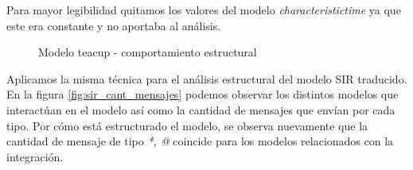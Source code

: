 Para mayor legibilidad quitamos los valores del modelo \textit{characteristictime} 
ya que este era constante y no aportaba al análisis.

\begin{figure}[H]
    \centering     %
        \caption{Modelo teacup - comportamiento estructural}
\end{figure}


Aplicamos la misma técnica para el análisis estructural del modelo SIR traducido.
En la figura \ref{fig:sir_cant_mensajes} podemos observar los distintos modelos
que interactúan en el modelo así como la cantidad de mensajes que envían por
cada tipo.
Por cómo está estructurado el modelo, se observa nuevamente que la cantidad de
mensaje de tipo \textit{*, @} coincide para los modelos relacionados con la
integración. 

